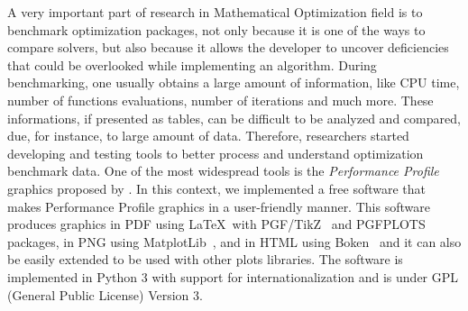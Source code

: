 A very important part of research in Mathematical Optimization field is to benchmark
optimization packages, not only because it is one of the ways to compare
solvers, but also because it allows the developer to uncover deficiencies that could
be overlooked while implementing  an algorithm. During benchmarking, one usually
obtains a large amount of information, like CPU time, number of functions
evaluations, number of iterations and much more. These informations, if
presented as tables, can be difficult to be analyzed and compared, due, for instance, to
large amount of data.  Therefore, researchers started developing and testing
tools to better process and understand optimization benchmark data. One of
the most widespread tools  is the \emph{Performance Profile} graphics proposed by
\textcite{Dolan:2002du}. In this context, we implemented a free software
that makes Performance Profile graphics in a user-friendly manner. This software produces graphics in PDF using \LaTeX\ with
PGF/TikZ~\cite{TikZ} and PGFPLOTS~\cite{pgfplots} packages, in
PNG using MatplotLib~\cite{Hunter:2007}, and in HTML using
Boken~\cite{url:bokeh} and it can also be easily
extended to be used with other plots libraries. The software is implemented
in Python 3 with support for internationalization and is under GPL (General
Public License) Version 3.
